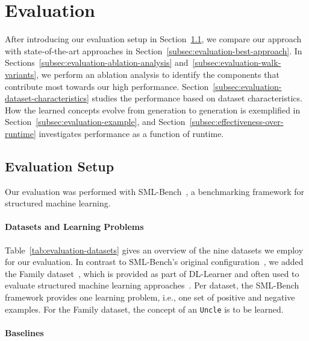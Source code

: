 \section{Evaluation}%
\label{sec:evaluation}

After introducing our evaluation setup in Section~\ref{subsec:evaluation-setup}, we compare our approach with state-of-the-art approaches in Section~\ref{subsec:evaluation-best-approach}. In Sections~\ref{subsec:evaluation-ablation-analysis} and~\ref{subsec:evaluation-walk-variants}, we perform an ablation analysis to identify the components that contribute most towards our high performance. Section~\ref{subsec:evaluation-dataset-characteristics} studies the performance based on dataset characteristics. How the learned concepts evolve from generation to generation is exemplified in Section~\ref{subsec:evaluation-example}, and Section~\ref{subsec:effectiveness-over-runtime} investigates performance as a function of runtime.

\subsection{Evaluation Setup}%
\label{subsec:evaluation-setup}

Our evaluation was performed with SML-Bench~\citep{Westphal2019SML-Bench}, a benchmarking framework for structured machine learning.

\paragraph{Datasets and Learning Problems}



Table~\ref{tab:evaluation-datasets} gives an overview of the nine datasets we employ for our evaluation. In contrast to SML-Bench's original configuration~\citep{Westphal2019SML-Bench},
we added the Family dataset~\citep{Lehmann2009DL-Learner}, which is provided as part of DL-Learner and often used to evaluate structured machine learning approaches~\citep{Tran2017Parallel}.
Per dataset, the SML-Bench framework provides one learning problem, i.e., one set of positive and negative examples. For the Family dataset, the concept of an \texttt{Uncle} is to be learned.

\paragraph{Baselines}

